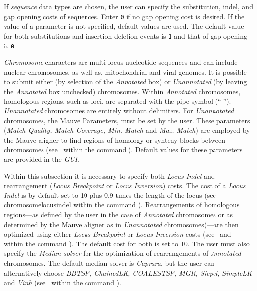 \begin{description}
\setlength{\labelsep}{5pt}
\setlength{\itemindent}{0pt}%
\setlength{\parindent}{0.5cm}        

\item [Sequence Parameters]  If \emph{sequence} data types are
chosen, the user can specify the substitution, indel, and gap opening
costs of sequences. Enter \texttt{0} if no gap opening cost is
desired. If the value of a parameter is not specified, default
values are used.  The default value for both substitutions and
insertion deletion events is \texttt{1} and that of gap-opening is
\texttt{0}.

\item [Chromosome and Mauve Parameters] \emph{Chromosome} characters
are multi-locus nucleotide sequences and can include nuclear
chromosomes, as well as, mitochondrial and viral genomes.  It is
possible to submit either  (by selection of
the \emph{Annotated} box) or \emph{Unannotated} (by leaving the
\emph{Annotated} box unchecked) chromosomes. Within \emph{Annotated}
chromosomes, homologous regions, such as loci, are separated with
the pipe symbol (``$\vert$'').  \emph{Unannotated} chromosomes are
entirely without delimiters. For \emph{Unannotated} chromosomes,
the Mauve Parameters, must be set by the user.  These parameters
(\emph{Match Quality, Match Coverage, Min. Match} and \emph {Max.
Match}) are employed by the Mauve aligner to find regions of homology
or synteny blocks between chromosomes (see~
within the command ). Default values for these
parameters are provided in the \emph{GUI}.

\indent Within this subsection it is necessary to specify both
\emph{Locus Indel} and rearrangement (\emph{Locus Breakpoint} or
\emph{Locus Inversion}) costs.  The cost of a \emph{Locus Indel}
is by default set to 10 plus 0.9 times the length of the locus
(see~ {chromosomelocusindel}  within the
command ).  Rearrangements of homologous
regions---as defined by the user in the case of \emph{Annotated}
chromosomes or as determined by the Mauve aligner as in \emph{Unannotated}
chromosomes)---are then optimized using either \emph{Locus Breakpoint}
or \emph{Locus Inversion} costs
(see~ and
~ within the
command ).  The default cost for both is set
to 10. The user must also specify the \emph{Median solver} for the
optimization of rearrangements of \emph{Annotated} chromosomes.
The default median solver is \emph{Caprara}, but the user can
alternatively choose \emph{BBTSP, ChainedLK, COALESTSP, MGR,
Siepel, SimpleLK} and \emph{Vinh}
(see~ within the
command ).


\end{description}
